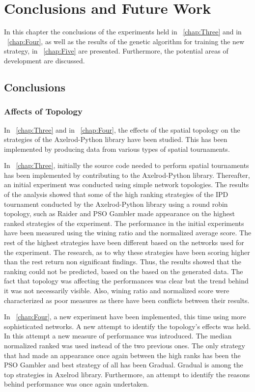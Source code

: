 \chapter{Conclusions and Future Work}
\label{chap:Six}

In this chapter the conclusions of the experiments held in
~\autoref{chap:Three} and in ~\autoref{chap:Four}, as well as the results
of the genetic algorithm for training the new strategy, in ~\autoref{chap:Five}
are presented. Furthermore, the potential areas of development are discussed.

\section{Conclusions}
\subsection{Affects of Topology}

In ~\autoref{chap:Three} and in ~\autoref{chap:Four}, the effects of the spatial
topology on the strategies of the Axelrod-Python library have been studied. This
has been implemented by producing data from various types of spatial tournaments.

In ~\autoref{chap:Three}, initially the source code needed to perform spatial tournaments
has been implemented by contributing to the Axelrod-Python library. Thereafter,
an initial experiment was conducted using simple network topologies.
The results of the analysis showed that some of the high ranking strategies
of the IPD tournament conducted by the Axelrod-Python library using a round robin
topology, such as Raider and PSO Gambler made appearance on the highest ranked
strategies of the experiment. The performance in the initial experiments have been
measured using the wining ratio and the normalized average score. The rest of
the highest strategies have been different based on the networks used for the
experiment. The research, as to why these strategies have been scoring higher than
the rest return non significant findings. Thus, the results showed that the ranking
could not be predicted, based on the based on the generated data. The fact that topology
was affecting the performances was clear but the trend behind it was not necessarily
visible. Also, wining ratio and normalized score were characterized as poor measures
as there have been conflicts between their results.

In ~\autoref{chap:Four}, a new experiment have been implemented, this time using
more sophisticated networks. A new attempt to identify the topology's effects
was held. In this attempt a new measure of performance was introduced. The median
normalized ranked was used instead of the two previous ones. The only strategy that had
made an appearance once again between the high ranks has been the PSO Gambler and
best strategy of all has been Gradual. Gradual is among the top strategies in
Axelrod library. Furthermore, an attempt to identify the reasons behind performance
was once again undertaken.

